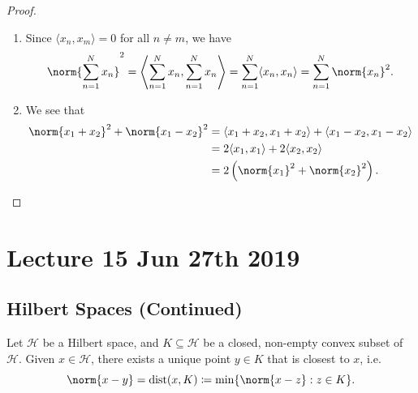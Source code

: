 \documentclass[notoc,notitlepage]{tufte-book}
\DeclareMathOperator{\dist}{dist}
\begin{document}
\begin{proof}
  \begin{enumerate}
    \item Since $\langle x_n, x_m \rangle = 0$ for all $n \neq m$,
      we have
      \begin{equation*}
        \norm{ \sum_{n=1}^{N} x_n }^2
        = \left\langle \sum_{n=1}^{N} x_n, \sum_{n=1}^{N} x_n \right\rangle
        = \sum_{n=1}^{N} \langle x_n, x_n \rangle
        = \sum_{n=1}^{N} \norm{x_n}^2.
      \end{equation*}

    \item We see that
      \begin{align*}
        \norm{x_1 + x_2}^2 + \norm{x_1 - x_2}^2
        &= \langle x_1 + x_2, x_1 + x_2 \rangle + \langle x_1 - x_2, x_1 - x_2 \rangle \\
        &= 2 \langle x_1, x_1 \rangle + 2 \langle x_2, x_2 \rangle \\
        &= 2 \left( \norm{x_1}^2 + \norm{x_2}^2 \right).
      \end{align*}
  \end{enumerate}
\end{proof}



\chapter{Lecture 15 Jun 27th 2019}%
\label{chp:lecture_15_jun_27th_2019}

\section{Hilbert Spaces (Continued)}%
\label{sec:hilbert_spaces_continued}

\begin{thm}\label{thm:closest_point_from_a_convex_set_in_a_hilbert_space}
  Let $\mathcal{H}$ be a Hilbert space,
  and $K \subseteq \mathcal{H}$ be a closed,
  non-empty convex subset of $\mathcal{H}$.
  Given $x \in \mathcal{H}$,
  there exists a unique point $y \in K$ that is closest to $x$,
  i.e.
  \begin{equation*}
    \norm{x - y} = \dist(x, K) \coloneqq \min \{ \norm{x - z} : z \in K \}.
  \end{equation*}
\end{thm}
\end{document}
